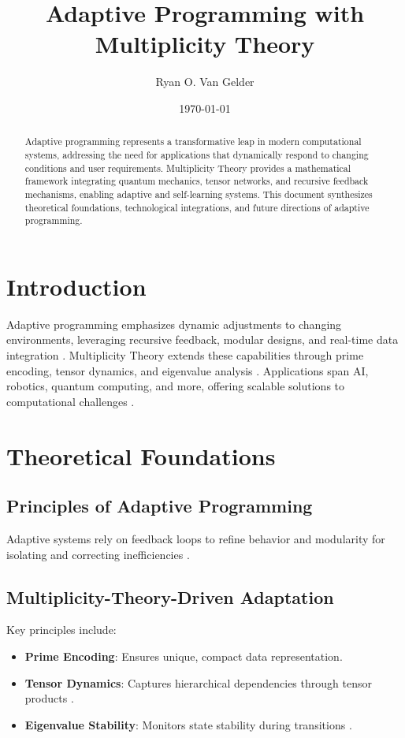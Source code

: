 \documentclass{article}
\theoremstyle{plain}
\begin{document}
\title{Adaptive Programming with Multiplicity Theory}

\author{Ryan O. Van Gelder}
\date{\today}

\maketitle
\begin{abstract}
Adaptive programming represents a transformative leap in modern computational systems, addressing the need for applications that dynamically respond to changing conditions and user requirements. Multiplicity Theory provides a mathematical framework integrating quantum mechanics, tensor networks, and recursive feedback mechanisms, enabling adaptive and self-learning systems. This document synthesizes theoretical foundations, technological integrations, and future directions of adaptive programming.
\end{abstract}

\section{Introduction}
Adaptive programming emphasizes dynamic adjustments to changing environments, leveraging recursive feedback, modular designs, and real-time data integration \cite{astrom2002feedback}. Multiplicity Theory extends these capabilities through prime encoding, tensor dynamics, and eigenvalue analysis \cite{maheshwari2020prime}. Applications span AI, robotics, quantum computing, and more, offering scalable solutions to computational challenges \cite{orus2021tensor}.

\section{Theoretical Foundations}
\subsection{Principles of Adaptive Programming}
Adaptive systems rely on feedback loops to refine behavior and modularity for isolating and correcting inefficiencies \cite{astrom2002feedback}.

\subsection{Multiplicity-Theory-Driven Adaptation}
Key principles include:
\begin{itemize}
    \item \textbf{Prime Encoding}: Ensures unique, compact data representation.
    \item \textbf{Tensor Dynamics}: Captures hierarchical dependencies through tensor products \cite{nielsen2010quantum}.
    \item \textbf{Eigenvalue Stability}: Monitors state stability during transitions \cite{orus2021tensor}.
\end{itemize}
\end{document}
